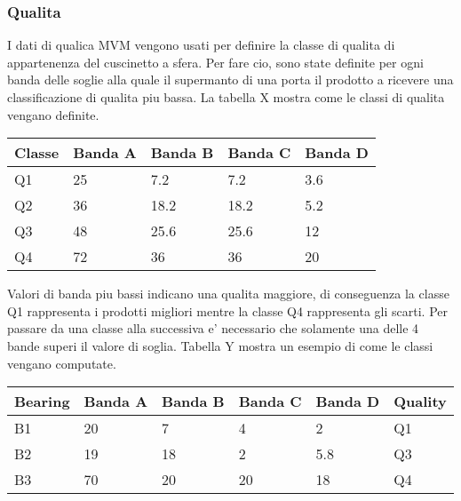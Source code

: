 \subsubsection{Qualita}
I dati di qualica MVM vengono usati per definire la classe di qualita di appartenenza del cuscinetto a sfera. Per fare cio, sono state definite per ogni banda delle soglie alla quale il supermanto di una porta il prodotto a ricevere una classificazione di qualita piu bassa.
La tabella X mostra come le classi di qualita vengano definite.


\begin{tabular}{|l|l|l|l|l|}
\hline
Classe & \multicolumn{1}{c|}{Banda A} & \multicolumn{1}{c|}{Banda B} & \multicolumn{1}{c|}{Banda C} & \multicolumn{1}{c|}{Banda D} \\ \hline
Q1     & 25                           & 7.2                          & 7.2                          & 3.6                          \\ \hline
Q2     & 36                           & 18.2                         & 18.2                         & 5.2                          \\ \hline
Q3     & 48                           & 25.6                         & 25.6                         & 12                           \\ \hline
Q4     & 72                           & 36                           & 36                           & 20                           \\ \hline
\end{tabular}

Valori di banda piu bassi indicano una qualita maggiore, di conseguenza la classe Q1 rappresenta i prodotti migliori mentre la classe Q4 rappresenta gli scarti. 
Per passare da una classe alla successiva e' necessario che solamente una delle 4 bande superi il valore di soglia. 
Tabella Y mostra un esempio di come le classi vengano computate.

\begin{tabular}{|l|l|l|l|l|l|}
\hline
Bearing & \multicolumn{1}{c|}{Banda A} & \multicolumn{1}{c|}{Banda B} & \multicolumn{1}{c|}{Banda C} & \multicolumn{1}{c|}{Banda D} & Quality \\ \hline
B1      & 20                           & 7                            & 4                            & 2                            & Q1      \\ \hline
B2      & 19                           & 18                           & 2                            & 5.8                          & Q3      \\ \hline
B3      & 70                           & 20                           & 20                           & 18                           & Q4      \\ \hline
\end{tabular}

